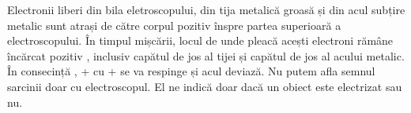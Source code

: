 \documentclass[12pt]{article}
\begin{document}
Electronii liberi din bila eletroscopului, din tija metalică groasă și din acul subțire metalic sunt atrași de către corpul pozitiv
înspre partea superioară a electroscopului. În timpul mișcării, locul de unde pleacă acești electroni rămâne încărcat pozitiv , inclusiv capătul
de jos al tijei și capătul de jos al acului metalic. În consecință , + cu  + se va respinge și acul deviază. Nu putem afla semnul sarcinii doar
cu electroscopul. El ne indică doar dacă un obiect este electrizat sau nu.
\end{document}
